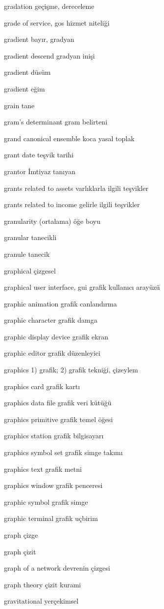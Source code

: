 \documentclass[12pt,fleqn]{article}\usepackage{../../common}
\begin{document}
gradation geçişme, dereceleme

grade of service, gos hizmet niteliği

gradient bayır, gradyan

gradient descend gradyan inişi

gradient düsüm

gradient eğim

grain tane

gram's determinant gram belirteni

grand canonical ensemble koca yasal toplak

grant date teşvik tarihi

grantor İmtiyaz tanıyan

grants related to assets varlıklarla ilgili teşvikler

grants related to income gelirle ilgili teşvikler

granularity (ortalama) öğe boyu

granular tanecikli

granule tanecik

graphical çizgesel

graphical user interface, gui grafik kullanıcı arayüzü

graphic animation grafik canlandırma

graphic character grafik damga

graphic display device grafik ekran

graphic editor grafik düzenleyici

graphics 1) grafik; 2) grafik tekniği, çizeylem

graphics card grafik kartı

graphics data file grafik veri kütüğü

graphics primitive grafik temel öğesi

graphics station grafik bilgisayarı

graphics symbol set grafik simge takımı

graphics text grafik metni

graphics window grafik penceresi

graphic symbol grafik simge

graphic terminal grafik uçbirim

graph çizge

graph çizit

graph of a network devrenin çizgesi

graph theory çizit kurami

gravitational yerçekimsel
\end{document}
